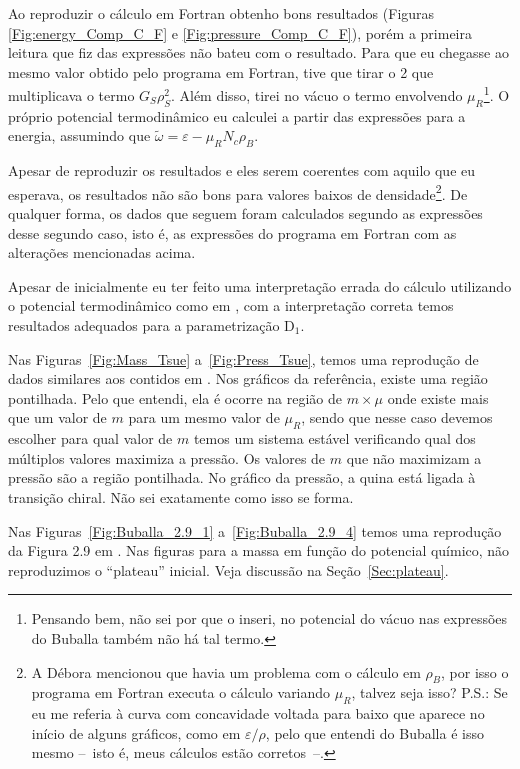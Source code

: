 Ao reproduzir o cálculo em Fortran obtenho bons resultados (Figuras \ref{Fig:energy_Comp_C_F} e \ref{Fig:pressure_Comp_C_F}), porém a primeira leitura que fiz das expressões não bateu com o resultado. Para que eu chegasse ao mesmo valor obtido pelo programa em Fortran, tive que tirar o 2 que multiplicava o termo $G_S \rho_S^2$. Além disso, tirei no vácuo o termo envolvendo $\mu_R$\footnote{Pensando bem, não sei por que o inseri, no potencial do vácuo nas expressões do Buballa também não há tal termo.}. O próprio potencial termodinâmico eu calculei a partir das expressões para a energia, assumindo que $\tilde{\omega} = \varepsilon - \mu_R N_c \rho_B$.
	
Apesar de reproduzir os resultados e eles serem coerentes com aquilo que eu esperava, os resultados não são bons para valores baixos de densidade\footnote{A Débora mencionou que havia um problema com o cálculo em $\rho_B$, por isso o programa em Fortran executa o cálculo variando $\mu_R$, talvez seja isso? P.S.: Se eu me referia à curva com concavidade voltada para baixo que aparece no início de alguns gráficos, como em $\varepsilon/\rho$, pelo que entendi do Buballa é isso mesmo --~isto é, meus cálculos estão corretos~--.}. De qualquer forma, os dados que seguem foram calculados segundo as expressões desse segundo caso, isto é, as expressões do programa em Fortran com as alterações mencionadas acima. 

Apesar de inicialmente eu ter feito uma interpretação errada do cálculo utilizando o potencial termodinâmico como em \textcite{Buballa1996}, com a interpretação correta temos resultados adequados para a parametrização D$_1$.

Nas Figuras~\ref{Fig:Mass_Tsue} a~\ref{Fig:Press_Tsue}, temos uma reprodução de dados similares aos contidos em \textcite{japoneses2}. Nos gráficos da referência, existe uma região pontilhada. Pelo que entendi, ela é ocorre na região de $m \times \mu$ onde existe mais que um valor de $m$ para um mesmo valor de $\mu_R$, sendo que nesse caso devemos escolher para qual valor de $m$ temos um sistema estável verificando qual dos múltiplos valores maximiza a pressão. Os valores de $m$ que não maximizam a pressão são a região pontilhada. No gráfico da pressão, a quina está ligada à transição chiral. Não sei exatamente como isso se forma.

Nas Figuras~\ref{Fig:Buballa_2.9_1} a~\ref{Fig:Buballa_2.9_4} temos uma reprodução da Figura 2.9 em \textcite{Buballa}. Nas figuras para a massa em função do potencial químico, não reproduzimos o ``plateau'' inicial. Veja discussão na Seção~\ref{Sec:plateau}.

